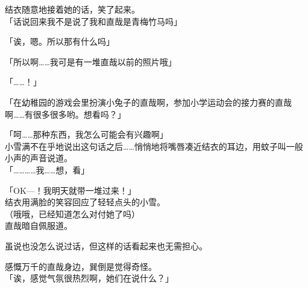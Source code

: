 结衣随意地接着她的话，笑了起来。\\

「话说回来我不是说了我和直哉是青梅竹马吗」

「诶，嗯。所以那有什么吗」

「所以啊……我可是有一堆直哉以前的照片哦」

「……！」

「在幼稚园的游戏会里扮演小兔子的直哉啊，参加小学运动会的接力赛的直哉啊……有很多很多哟。想看吗？」

「呵……那种东西，我怎么可能会有兴趣啊」\\

小雪满不在乎地说出这句话之后……悄悄地将嘴唇凑近结衣的耳边，用蚊子叫一般小声的声音说道。\\

「…………我……想，看」

「OK—！我明天就带一堆过来！」\\

结衣用满脸的笑容回应了轻轻点头的小雪。\\

（哦哦，已经知道怎么对付她了吗）\\

直哉暗自佩服道。

虽说也没怎么说过话，但这样的话看起来也无需担心。

感慨万千的直哉身边，巽倒是觉得奇怪。\\

「诶，感觉气氛很热烈啊，她们在说什么？」

